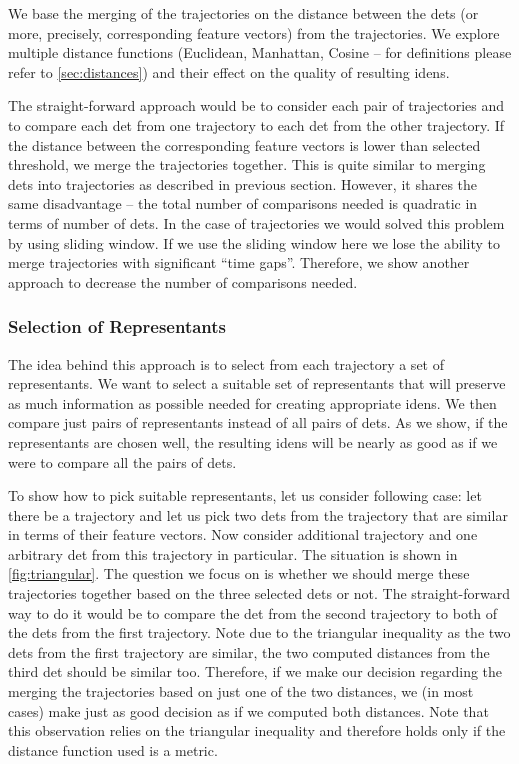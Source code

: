 We base the merging of the trajectories on the distance between the \glspl{det} (or more, precisely, corresponding feature vectors) from the trajectories. We explore multiple distance functions (Euclidean, Manhattan, Cosine -- for definitions please refer to \autoref{sec:distances}) and their effect on the quality of resulting \glspl{iden}.

The straight-forward approach would be to consider each pair of trajectories and to compare each \gls{det} from one trajectory to each \gls{det} from the other trajectory. If the distance between the corresponding feature vectors is lower than selected threshold, we merge the trajectories together. This is quite similar to merging \glspl{det} into trajectories as described in previous section. However, it shares the same disadvantage -- the total number of comparisons needed is quadratic in terms of number of \glspl{det}. In the case of trajectories we would solved this problem by using sliding window. If we use the sliding window here we lose the ability to merge trajectories with significant ``time gaps''. Therefore, we show another approach to decrease the number of comparisons needed.


\subsubsection{Selection of Representants}


The idea behind this approach is to select from each trajectory a set of representants. We want to select a suitable set of representants that will preserve as much information as possible needed for creating appropriate \glspl{iden}. We then compare just pairs of representants instead of all pairs of \glspl{det}. As we show, if the representants are chosen well, the resulting \glspl{iden} will be nearly as good as if we were to compare all the pairs of \glspl{det}.

To show how to pick suitable representants, let us consider following case: let there be a trajectory and let us pick two \glspl{det} from the trajectory that are similar in terms of their feature vectors. Now consider additional trajectory and one arbitrary \gls{det} from this trajectory in particular. The situation is shown in \autoref{fig:triangular}. The question we focus on is whether we should merge these trajectories together based on the three selected \glspl{det} or not. The straight-forward way to do it would be to compare the \gls{det} from the second trajectory to both of the \glspl{det} from the first trajectory. Note due to the triangular inequality as the two \glspl{det} from the first trajectory are similar, the two computed distances from the third \gls{det} should be similar too. Therefore, if we make our decision regarding the merging the trajectories based on just one of the two distances, we (in most cases) make just as good decision as if we computed both distances. Note that this observation relies on the triangular inequality and therefore holds only if the distance function used is a metric.

